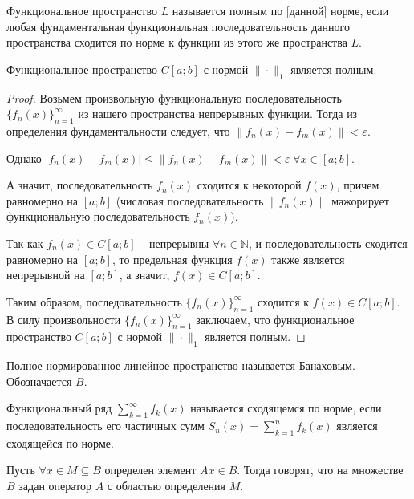 \begin{definition}
    Функциональное пространство $L$ называется полным по [данной] норме, если любая фундаментальная функциональная последовательность данного пространства сходится по норме к функции из этого же пространства $L$.
\end{definition}

\begin{theorem}
    Функциональное пространство $C[a; b]$ с нормой $\| \cdot \|_1$ является полным.
\end{theorem}
\begin{proof}
    Возьмем произвольную функциональную последовательность $\{f_n(x)\}_{n = 1}^{\infty}$ из нашего пространства непрерывных функции. Тогда из определения фундаментальности следует, что $\|f_n(x) - f_m(x)\| < \varepsilon$.
    
    Однако $|f_n(x) - f_m(x)| \leqslant \|f_n(x) - f_m(x)\| < \varepsilon \; \forall x \in [a; b]$.
    
    А значит, последовательность $f_n(x)$ сходится к некоторой $f(x)$, причем равномерно на $[a; b]$ (числовая последовательность $\|f_n(x)\|$ мажорирует функциональную последовательность $f_n(x)$).
    
    Так как $f_n(x) \in C[a; b]$ -- непрерывны $\forall n \in \mathbb{N}$, и последовательность сходится равномерно на $[a; b]$, то предельная функция $f(x)$ также является непрерывной на $[a; b]$, а значит, $f(x) \in C[a; b]$. 
    
    Таким образом, последовательность $\{f_n(x)\}_{n = 1}^{\infty}$ сходится к $f(x) \in C[a; b]$. В силу произвольности $\{f_n(x)\}_{n = 1}^{\infty}$ заключаем, что функциональное пространство $C[a; b]$ с нормой $\| \cdot \|_1$ является полным.
\end{proof}

\begin{definition}
    Полное нормированное линейное пространство называется Банаховым. Обозначается $B$.
\end{definition}

\begin{definition}
    Функциональный ряд $\sum\limits_{k = 1}^{\infty} f_k(x)$ называется сходящемся по норме, если последовательность его частичных сумм $S_n(x) = \sum\limits_{k = 1}^{n} f_k(x)$ является сходящейся по норме.
\end{definition}

\begin{definition}
    Пусть $\forall x \in M \subseteq B$ определен элемент $Ax \in B$. Тогда говорят, что на множестве $B$ задан оператор $A$ с областью определения $M$.
\end{definition}

